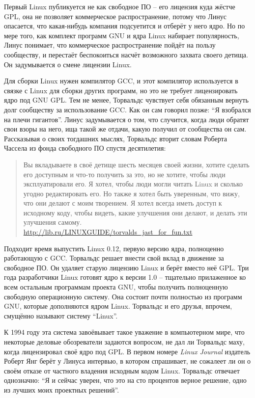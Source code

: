 Первый Linux публикуется не как свободное ПО -- его лицензия куда жёстче GPL, она не позволяет коммерческое распространение, потому что Линус опасается, что какая-нибудь компания подсуетится и отберёт у него ядро. Но по мере того, как комплект программ GNU и ядра Linux набирает популярность, Линус понимает, что коммерческое распространение пойдёт на пользу сообществу, и перестаёт беспокоиться насчёт возможного захвата своего детища. Он задумывается о смене лицензии Linux.

Для сборки Linux нужен компилятор GCC, и этот компилятор используется в связке с Linux для сборки других программ, но это не требует лицензировать ядро под GNU GPL. Тем не менее, Торвальдс чувствует себя обязанным вернуть долг сообществу за использование GCC. Как он сам говорил позже: ``Я взобрался на плечи гигантов''. Линус задумывается о том, что случится, когда люди обратят свои взоры на него, ища такой же отдачи, какую получил от сообщества он сам. Рассказывая о своих тогдашних мыслях, Торвальдс вторит словам Роберта Чассела из фонда свободного ПО спустя десятилетия:

\begin{quote}
Вы вкладываете в своё детище шесть месяцев своей жизни, хотите сделать его доступным и что-то получить за это, но не хотите, чтобы люди эксплуатировали его. Я хотел, чтобы люди могли читать Linux и сколько угодно редактировать его. Но также я хотел быть уверенным, что вижу, что они делают с моим творением. Я хотел всегда иметь доступ к исходному коду, чтобы видеть, какие улучшения они делают, и делать эти улучшения самому. \url{http://lib.ru/LINUXGUIDE/torvalds_jast_for_fun.txt}
\end{quote}

Подходит время выпустить Linux 0.12, первую версию ядра, полноценно работающую с GCC. Торвальдс решает внести свой вклад в движение за свободное ПО. Он удаляет старую лицензию Linux и берёт вместо неё GPL. Три года разработчики Linux готовят ядро к версии 1.0 -- тщательно прилаженное ко всем остальным программам проекта GNU, чтобы получить полноценную свободную операционную систему. Она состоит почти полностью из программ GNU, которые дополняются ядром Linux. Торвальдс и его друзья, впрочем, смущённо называют систему ``Linux''.

К 1994 году эта система завоёвывает такое уважение в компьютерном мире, что некоторые деловые обозреватели задаются вопросом, не дал ли Торвальдс маху, когда лицензировал своё ядро под GPL. В первом номере \textit{Linux Journal} издатель Роберт Янг берёт у Линуса интервью, в котором спрашивает, не сожалеет ли он о своём отказе от частного владения исходным кодом Linux. Торвальдс отвечает однозначно: ``Я и сейчас уверен, что это на сто процентов верное решение, одно из лучших моих проектных решений''. 


